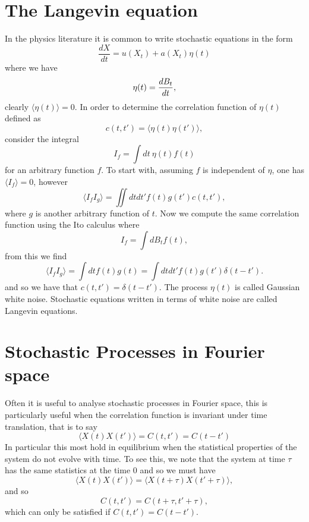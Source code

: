 \documentclass[11pt]{report}
\begin{document}
\section{The Langevin equation}
In the physics literature it is common to write stochastic equations in the form
\begin{equation}
\boxed{
\frac{dX}{dt} = u(X_t) + a(X_t)\eta(t)}
\end{equation}
where we have 
\begin{equation}
\eta(t) = {dB_t\over dt},
\end{equation}
clearly $\langle \eta(t)\rangle = 0$.
In order to determine the correlation function of $\eta(t)$ defined as
\begin{equation}
c(t,t') =\langle \eta(t)\eta(t')\rangle,
\end{equation}
consider the integral 
\begin{equation}
I_f = \int dt \ \eta(t) f(t)
\end{equation}
for an arbitrary function $f$. To start with, assuming $f$ is independent of $\eta$, one has
 $\langle I_f\rangle = 0$, however 
 \begin{equation}
 \langle I_f I_g\rangle  = \iint dt dt' f(t) g(t') c(t,t'),\label{wn1}
\end{equation} 
where $g$ is another arbitrary function of $t$. Now we compute the same correlation function using the Ito calculus where
\begin{equation}
I_f = \int dB_t f(t),
\end{equation}
from this we find
\begin{equation}
\langle I_f I_g\rangle = \int dt f(t) g(t) = \int dt dt' f(t) g(t')\delta(t-t')\label{wn2}.
\end{equation}
and so we have that $c(t,t') = \delta(t-t')$. The process $\eta(t)$ is called Gaussian white noise. Stochastic equations written in terms of white noise are called Langevin equations.

\section{Stochastic Processes in Fourier space}
Often it is useful to analyse stochastic processes in Fourier space, this is particularly useful
when the correlation function is invariant under time translation, that is to say
\begin{equation}
\langle X(t)X(t')\rangle = C(t,t')=C(t-t')
\end{equation}
In particular this most hold in equilibrium when the statistical properties of the system do not evolve with time. To see this, we note that  the system at time $\tau$ has the same statistics at the time $0$ and so we must have
\begin{equation}
\langle X(t)X(t')\rangle = \langle X(t+\tau)X(t'+\tau)\rangle,
\end{equation}
and so
\begin{equation}
C(t,t') = C(t+\tau, t'+\tau),
\end{equation}
 which can only be satisfied if $C(t,t')=C(t-t')$. 
 
\end{document}
